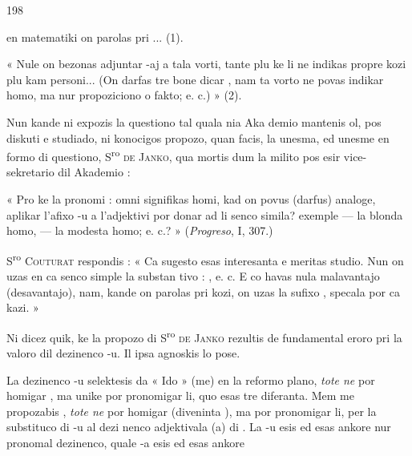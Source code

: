 \begin{VUpage}[202]{198}

\VUcontinue
en matematiki on parolas pri \cc
{}... (1).

« Nule on bezonas adjuntar -aj a tala vorti, tante plu ke\nl
li ne indikas propre kozi plu kam personi... (On darfas tre\nl
bone dicar , nam ta vorto ne povas indikar\nl
homo, ma nur propoziciono o fakto; e. c.) » (2).

Nun kande ni expozis la questiono tal quala nia Aka\cc
demio mantenis ol, pos diskuti e studiado, ni konocigos\nl
propozo, quan facis, la unesma, ed unesme en formo di\nl
questiono, S\textsuperscript{ro} \textsc{de Janko}, qua mortis dum la milito pos esir\nl
vice-sekretario dil Akademio :

« Pro ke la pronomi : \nl
omni signifikas homi, kad on povus (darfus) analoge,\nl
aplikar l'afixo -u a l'adjektivi por donar ad li senco simila?\nl
exemple  --- la blonda homo,  --- la\nl
modesta homo; e. c.? » (\textit{Progreso}, I, 307.)

S\textsuperscript{ro} \textsc{Couturat} respondis : « Ca sugesto esas interesanta e\nl
meritas studio. Nun on uzas en ca senco simple la substan\cc
tivo : , e. c. E co havas nula malavantajo\nl
(desavantajo), nam, kande on parolas pri kozi, on uzas la\nl
sufixo , specala por ca kazi. »

Ni dicez quik, ke la propozo di S\textsuperscript{ro} \textsc{de Janko} rezultis de\nl
fundamental eroro pri la valoro dil dezinenco -u. Il ipsa\nl
agnoskis lo pose.

La dezinenco -u selektesis da « Ido » (me) en la reformo\cc
plano, \textit{tote ne} por homigar , ma\nl
unike por pronomigar li, quo esas tre diferanta. Mem me\nl
propozabis , \textit{tote ne} por homigar  (diveninta\nl
{}), ma por pronomigar li, per la substituco di -u al dezi\cc
nenco adjektivala (a) di . La -u esis ed esas ankore\nl
nur pronomal dezinenco, quale -a esis ed esas ankore\nl
\end{VUpage}

